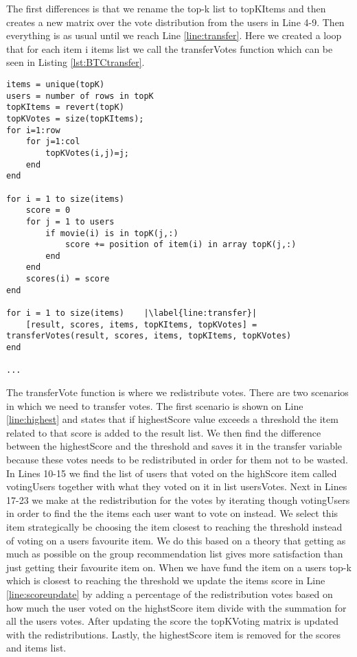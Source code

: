 The first differences is that we rename the top-k list to topKItems and then creates a new matrix over the vote distribution from the users in Line 4-9. Then everything is as usual until we reach Line \ref{line:transfer}. Here we created a loop that for each item i items list we call the transferVotes function which can be seen in Listing \ref{lst:BTCtransfer}.


\begin{lstlisting}[caption={Borda transferable count implementation},label=lst:BTC]
items = unique(topK)
users = number of rows in topK
topKItems = revert(topK)
topKVotes = size(topKItems);
for i=1:row
    for j=1:col
        topKVotes(i,j)=j;
    end 
end

for i = 1 to size(items)
	score = 0
	for j = 1 to users
		if movie(i) is in topK(j,:)
			score += position of item(i) in array topK(j,:)
		end
	end
	scores(i) = score
end

for i = 1 to size(items)	|\label{line:transfer}|
	[result, scores, items, topKItems, topKVotes] = transferVotes(result, scores, items, topKItems, topKVotes)
end
	
...
\end{lstlisting}

The transferVote function is where we redistribute votes. There are two scenarios in which we need to transfer votes. The first scenario is shown on Line \ref{line:highest} and states that if highestScore value exceeds a threshold the item related to that score is added to the result list. We then find the difference between the highestScore and the threshold and saves it in the transfer variable because these votes needs to be redistributed in order for them not to be wasted. In Lines 10-15 we find the list of users that voted on the highScore item  called votingUsers together with what they voted on it in list usersVotes. Next in Lines 17-23 we make at the redistribution for the votes by iterating though votingUsers in order to find the the items each user want to vote on instead. We select this item strategically be choosing the item closest to reaching the threshold instead of voting on a users favourite item. We do this based on a theory that getting as much as possible on the group recommendation list gives more satisfaction than just getting their favourite item on. When we have fund the item on a users top-k which is closest to reaching the threshold we update the items score in Line \ref{line:scoreupdate} by adding a percentage of the redistribution votes based on how much the user voted on the highstScore item divide with the summation for all the users votes. After updating the score the topKVoting matrix is updated with the redistributions. Lastly, the highestScore item is removed for the scores and items list. 

